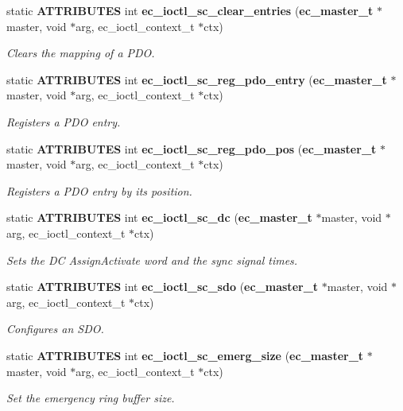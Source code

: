 \begin{DoxyCompactItemize}
static {\bf \-A\-T\-T\-R\-I\-B\-U\-T\-E\-S} int {\bf ec\-\_\-ioctl\-\_\-sc\-\_\-clear\-\_\-entries} ({\bf ec\-\_\-master\-\_\-t} $\ast$master, void $\ast$arg, ec\-\_\-ioctl\-\_\-context\-\_\-t $\ast$ctx)
\begin{DoxyCompactList}\small\item\em \-Clears the mapping of a \-P\-D\-O. \end{DoxyCompactList}\item 
static {\bf \-A\-T\-T\-R\-I\-B\-U\-T\-E\-S} int {\bf ec\-\_\-ioctl\-\_\-sc\-\_\-reg\-\_\-pdo\-\_\-entry} ({\bf ec\-\_\-master\-\_\-t} $\ast$master, void $\ast$arg, ec\-\_\-ioctl\-\_\-context\-\_\-t $\ast$ctx)
\begin{DoxyCompactList}\small\item\em \-Registers a \-P\-D\-O entry. \end{DoxyCompactList}\item 
static {\bf \-A\-T\-T\-R\-I\-B\-U\-T\-E\-S} int {\bf ec\-\_\-ioctl\-\_\-sc\-\_\-reg\-\_\-pdo\-\_\-pos} ({\bf ec\-\_\-master\-\_\-t} $\ast$master, void $\ast$arg, ec\-\_\-ioctl\-\_\-context\-\_\-t $\ast$ctx)
\begin{DoxyCompactList}\small\item\em \-Registers a \-P\-D\-O entry by its position. \end{DoxyCompactList}\item 
static {\bf \-A\-T\-T\-R\-I\-B\-U\-T\-E\-S} int {\bf ec\-\_\-ioctl\-\_\-sc\-\_\-dc} ({\bf ec\-\_\-master\-\_\-t} $\ast$master, void $\ast$arg, ec\-\_\-ioctl\-\_\-context\-\_\-t $\ast$ctx)
\begin{DoxyCompactList}\small\item\em \-Sets the \-D\-C \-Assign\-Activate word and the sync signal times. \end{DoxyCompactList}\item 
static {\bf \-A\-T\-T\-R\-I\-B\-U\-T\-E\-S} int {\bf ec\-\_\-ioctl\-\_\-sc\-\_\-sdo} ({\bf ec\-\_\-master\-\_\-t} $\ast$master, void $\ast$arg, ec\-\_\-ioctl\-\_\-context\-\_\-t $\ast$ctx)
\begin{DoxyCompactList}\small\item\em \-Configures an \-S\-D\-O. \end{DoxyCompactList}\item 
static {\bf \-A\-T\-T\-R\-I\-B\-U\-T\-E\-S} int {\bf ec\-\_\-ioctl\-\_\-sc\-\_\-emerg\-\_\-size} ({\bf ec\-\_\-master\-\_\-t} $\ast$master, void $\ast$arg, ec\-\_\-ioctl\-\_\-context\-\_\-t $\ast$ctx)
\begin{DoxyCompactList}\small\item\em \-Set the emergency ring buffer size. \end{DoxyCompactList}\item 

\end{DoxyCompactItemize}
